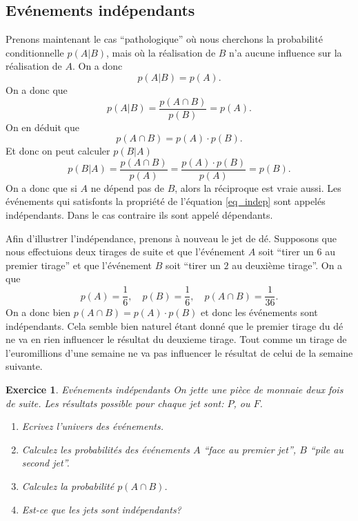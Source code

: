 \documentclass[a4paper,12pt]{book}
\renewcommand{\eqref}[1]{\ref{#1}}
\newtheorem*{exercice}{Exercice}
\begin{document}
\subsection{Evénements indépendants}

Prenons maintenant le cas ``pathologique'' où nous cherchons la probabilité conditionnelle $p(A|B)$, mais où 
la réalisation de $B$ n'a aucune influence sur la réalisation de $A$. On a donc 
\begin{equation}
 p(A|B)=p(A).
\end{equation}
On a donc que 
\begin{equation}
 p(A|B)=\frac{p(A\cap B)}{p(B)}=p(A).
\end{equation}
On en déduit que 
\begin{equation}
p(A\cap B)=p(A)\cdot p(B).\label{eq_indep}
\end{equation}
Et donc on peut calculer $p(B|A)$
\begin{equation}
p(B|A)=\frac{p(A\cap B)}{p(A)}=\frac{p(A)\cdot p(B)}{p(A)}=p(B).
\end{equation}
On a donc que si $A$ ne dépend pas de $B$, alors la réciproque est vraie aussi.
Les événements qui satisfonts la propriété de l'équation \eqref{eq_indep} sont appelés
indépendants. Dans le cas contraire ils sont appelé dépendants.

Afin d'illustrer l'indépendance, prenons à nouveau le jet de dé. Supposons que nous effectuions
deux tirages de suite et que l'événement $A$ soit ``tirer un 6 au premier tirage'' et que l'événement $B$
soit ``tirer un $2$ au deuxième tirage''. On a que 
\begin{equation}
 p(A)=\frac{1}{6},\quad p(B)=\frac{1}{6},\quad p(A\cap B)=\frac{1}{36}.
\end{equation}
On a donc bien $p(A\cap B)=p(A)\cdot p(B)$ et donc les événements sont indépendants. 
Cela semble bien naturel étant donné que le premier tirage du dé ne va en rien influencer le résultat du deuxieme 
tirage. Tout comme un tirage de l'euromillions d'une semaine ne va pas influencer le résultat de celui de la semaine suivante.

\begin{exercice}{Evénements indépendants}
On jette une pièce de monnaie deux fois de suite. Les résultats possible pour chaque jet sont: $P$, ou $F$.
\begin{enumerate}
 \item Ecrivez l'univers des événements.
 \item Calculez les probabilités des événements $A$ ``face au premier jet'', $B$ ``pile au second jet''.
 \item Calculez la probabilité $p(A\cap B)$. 
 \item Est-ce que les jets sont indépendants?
\end{enumerate}
\end{exercice}
\end{document}
